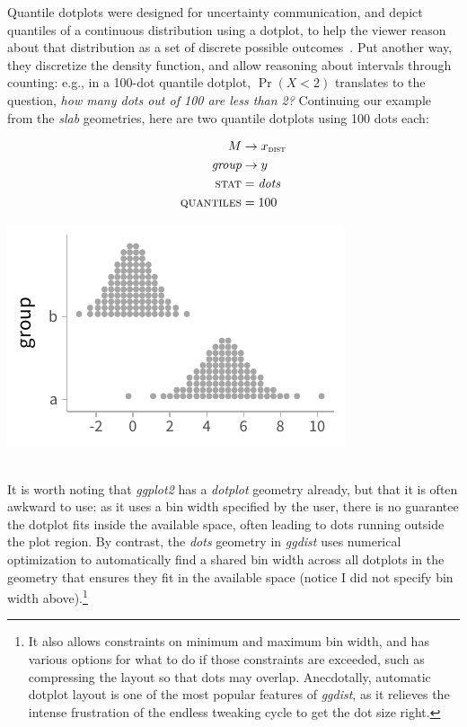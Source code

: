 \documentclass[journal]{vgtc}                     %
\newcommand{\equationfigure}[2]{%
\noindent
\begin{minipage}{.5\columnwidth}
\setlength{\abovedisplayskip}{0pt}
\setlength{\belowdisplayskip}{0pt}
#1\end{minipage}%
\begin{minipage}{.4\columnwidth}\centering #2 \end{minipage}%
\vspace{.5\belowdisplayskip}\\
}
\begin{document}
Quantile dotplots were designed for uncertainty communication, and depict quantiles of a continuous distribution using a dotplot, to help the viewer reason about that distribution as a set of discrete possible outcomes~\cite{kay2016ish}. Put another way, they discretize the density function, and allow reasoning about intervals through counting: e.g., in a 100-dot quantile dotplot, $\Pr(X < 2)$ translates to the question, \textit{how many dots out of 100 are less than 2?} Continuing our example from the \textit{slab} geometries, here are two quantile dotplots using 100 dots each:

\equationfigure{
\begin{align*}
M &\rightarrow x_\textsc{dist}\\
\textit{group} &\rightarrow y\\
\textsc{stat} &= \mathit{dots}\\
\textsc{quantiles} &= 100
\end{align*}
}{\includegraphics[width=1.2\columnwidth]{figs/3-dots_two.pdf}}
It is worth noting that \textit{ggplot2} has a \textit{dotplot} geometry already, but that it is often awkward to use: as it uses a bin width specified by the user, there is no guarantee the dotplot fits inside the available space, often leading to dots running outside the plot region. By contrast, the \textit{dots} geometry in \textit{ggdist} uses numerical optimization to automatically find a shared bin width across all dotplots in the geometry that ensures they fit in the available space (notice I did not specify bin width above).\footnote{It also allows constraints on minimum and maximum bin width, and has various options for what to do if those constraints are exceeded, such as compressing the layout so that dots may overlap. Anecdotally, automatic dotplot layout is one of the most popular features of \textit{ggdist}, as it relieves the intense frustration of the endless tweaking cycle to get the dot size right.}
\end{document}
